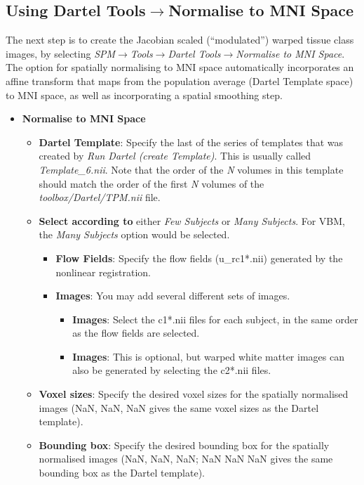 \subsection{Using Dartel Tools$\rightarrow$Normalise to MNI Space}
The next step is to create the Jacobian scaled (``modulated'') warped tissue class images, by selecting \emph{SPM$\rightarrow$Tools$\rightarrow$Dartel Tools$\rightarrow$Normalise to MNI Space}.
The option for spatially normalising to MNI space automatically incorporates an affine transform that maps from the population average (Dartel Template space) to MNI space, as well as incorporating a spatial smoothing step.
\begin{itemize}
\item{{\bf Normalise to MNI Space}
  \begin{itemize}
  \item{{\bf Dartel Template}: Specify the last of the series of templates that was created by \emph{Run Dartel (create Template)}.  This is usually called \emph{Template\_6.nii}.  Note that the order of the \emph{N} volumes in this template should match the order of the first \emph{N} volumes of the \emph{toolbox/Dartel/TPM.nii} file.}
  \item{{\bf Select according to} either \emph{Few Subjects} or \emph{Many Subjects}.  For VBM, the \emph{Many Subjects} option would be selected.
    \begin{itemize}
    \item{{\bf Flow Fields}: Specify the flow fields (u\_rc1*.nii) generated by the nonlinear registration.}
    \item{{\bf Images}: You may add several different sets of images.
      \begin{itemize}
      \item{{\bf Images}: Select the c1*.nii files for each subject, in the same order as the flow fields are selected.}
      \item{{\bf Images}: This is optional, but warped white matter images can also be generated by selecting the c2*.nii files.}
      \end{itemize}}
    \end{itemize}}
    \item{{\bf Voxel sizes}: Specify the desired voxel sizes for the spatially normalised images (NaN, NaN, NaN gives the same voxel sizes as the Dartel template).}
    \item{{\bf Bounding box}: Specify the desired bounding box for the spatially normalised images (NaN, NaN, NaN; NaN NaN NaN gives the same bounding box as the Dartel template).}

\end{itemize}}
\end{itemize}
